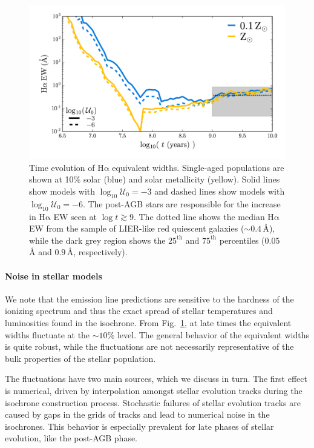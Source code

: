 \documentclass[preprint2]{aastex62}
\newcommand{\ha}{\ensuremath{\mathrm{H\alpha}}\xspace}
\newcommand{\logten}{\ensuremath{\log_{10}}}
\newcommand{\ang}{\ensuremath{\mbox{\AA}}\xspace}
\newcommand{\logUeq}[1]{\ensuremath{\logten \mathcal{U}_0 = #1}}
\begin{document}
\begin{figure}
  \begin{center}
    \includegraphics[width=\linewidth]{figs/f4.png}
    \caption{{\sc Time evolution of \ha equivalent widths.} Single-aged populations are shown at 10\% solar (blue) and solar metallicity (yellow). Solid lines show models with \logUeq{-3} and dashed lines show models with \logUeq{-6}. The post-AGB stars are responsible for the increase in \ha EW seen at $\log t \gtrsim 9$. The dotted line shows the median \ha EW from the \citet{Yan+2018} sample of LIER-like red quiescent galaxies (${\sim}0.4\,$\ang), while the dark grey region shows the $25^{\mathrm{th}}$ and $75^{\mathrm{th}}$ percentiles ($0.05\,$\ang and $0.9\,$\ang, respectively).}
    \label{fig:EW}
  \end{center}
\end{figure}

\paragraph{Noise in stellar models} We note that the emission line predictions are sensitive to the hardness of the ionizing spectrum and thus the exact spread of stellar temperatures and luminosities found in the isochrone. From Fig.~\ref{fig:EW}, at late times the equivalent widths fluctuate at the ${\sim}10\%$ level. The general behavior of the equivalent widths is quite robust, while the fluctuations are not necessarily representative of the bulk properties of the stellar population.

The fluctuations have two main sources, which we discuss in turn. The first effect is numerical, driven by interpolation amongst stellar evolution tracks during the isochrone construction process. Stochastic failures of stellar evolution tracks are caused by gaps in the grids of tracks and lead to numerical noise in the isochrones. This behavior is especially prevalent for late phases of stellar evolution, like the post-AGB phase.
\end{document}
